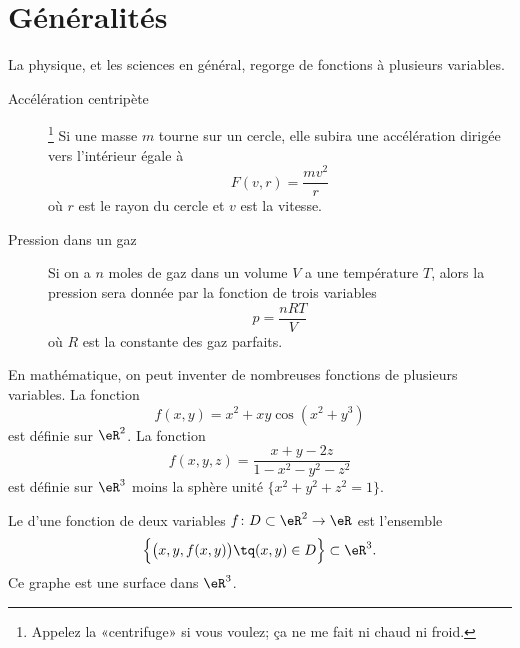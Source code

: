 
\section{Généralités}

La physique, et les sciences en général, regorge de fonctions à plusieurs variables.
\begin{description}
    \item[Accélération centripète]\footnote{Appelez la «centrifuge» si vous voulez; ça ne me fait ni chaud ni froid.}  Si une masse $m$ tourne sur un cercle, elle subira une accélération dirigée vers l'intérieur égale à
        \begin{equation}
            F(v,r)=\frac{ mv^2 }{ r }
        \end{equation}
        où $r$ est le rayon du cercle et $v$ est la vitesse.
    \item[Pression dans un gaz] Si on a $n$ moles de gaz dans un volume $V$ a une température $T$, alors la pression sera donnée par la fonction de trois variables
        \begin{equation}
            p=\frac{ nRT }{ V }
        \end{equation}
        où $R$ est la constante des gaz parfaits.
\end{description}
En mathématique, on peut inventer de nombreuses fonctions de plusieurs variables. La fonction
\begin{equation}
    f(x,y)=x^2+xy\cos(x^2+y^3)
\end{equation}
est définie sur $\eR^2$. La fonction
\begin{equation}
    f(x,y,z)=\frac{ x+y-2z }{ 1-x^2-y^2-z^2 }
\end{equation}
est définie sur $\eR^3$ moins la sphère unité $\{ x^2+y^2+z^2=1 \}$.

Le  d'une fonction de deux variables $f\colon D\subset\eR^2\to \eR$ est l'ensemble
\begin{equation}
    \Big\{   \big( x,y,f(x,y) \big) \tq (x,y)\in D \Big\}\subset\eR^3.
\end{equation}
Ce graphe est une surface dans $\eR^3$.

